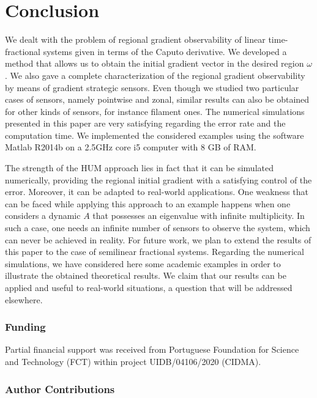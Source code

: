 \documentclass{article}
\begin{document}

\section{Conclusion}
\label{sec:8}

We dealt with the problem of regional gradient observability 
of linear time-fractional systems given in terms of the Caputo 
derivative. We developed a method that allows us to obtain the 
initial gradient vector in the desired region $\omega$. We also 
gave a complete characterization of the regional gradient observability 
by means of gradient strategic sensors. Even though we studied two particular 
cases of sensors, namely pointwise and zonal, similar results can also 
be obtained for other kinds of sensors, for instance filament ones. 
The numerical simulations presented in this paper are very satisfying 
regarding the error rate and the computation time. We implemented 
the considered examples using the software Matlab R2014b on a 2.5GHz 
core i5 computer with 8 GB of RAM. 

The strength of the HUM approach lies in fact that it can be simulated numerically, 
providing the regional initial gradient with a satisfying control of the error. 
Moreover, it can be adapted to real-world applications. One weakness 
that can be faced while applying this approach to an example 
happens when one considers a dynamic $A$ that possesses an eigenvalue 
with infinite multiplicity. In such a case, one needs an infinite number 
of sensors to observe the system, which can never be achieved in reality.
For future work, we plan to extend the results of this paper 
to the case of semilinear fractional systems. 
Regarding the numerical simulations, we have
considered here some academic examples in order to illustrate 
the obtained theoretical results. We claim that our results 
can be applied and useful to real-world situations, 
a question that will be addressed elsewhere.


\subsubsection*{Funding}

Partial financial support was received from 
Portuguese Foundation for Science and Technology (FCT) 
within project UIDB/04106/2020 (CIDMA). 

\subsubsection*{Author Contributions}
\end{document}
